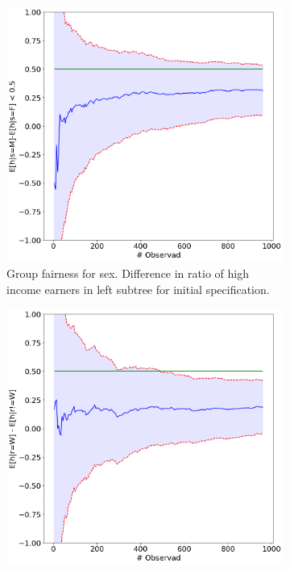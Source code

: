 \begin{figure}[ht]
    \centering
    \begin{subfigure}{0.48\linewidth}
    \includegraphics[width=\linewidth]{avoir/images/adult-left-initial.png}
    \caption{Group fairness for sex. Difference in ratio of high income earners in left subtree for initial specification.}
    \label{fig:casestudy:adult:specplot:left}
    \end{subfigure}
    \hfill
    \begin{subfigure}{0.48\linewidth}
    \centering
    \includegraphics[width=\linewidth]{avoir/images/adult-right-initial.png}

\end{subfigure}
\end{figure}
